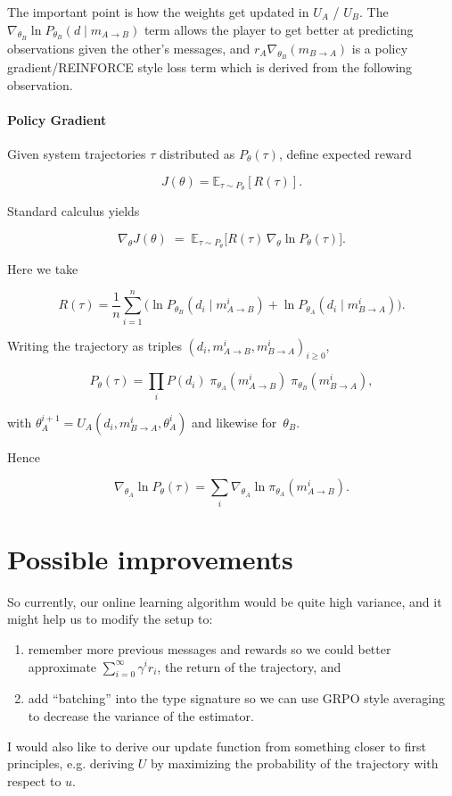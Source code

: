 \documentclass{article}
\begin{document}
The important point is how the weights get updated in $U_A$ / $U_B$.
The $\nabla_{\theta_B} \ln P_{\theta_B}(d \mid m_{A \rightarrow B})$ term allows the player to get better at predicting observations given the other's messages, and $r_A \nabla_{\theta_B} (m_{B \rightarrow A})$ is a policy gradient/REINFORCE style loss term which is derived from the following observation.

\paragraph{Policy Gradient}

Given system trajectories $\tau$ distributed as $P_\theta(\tau)$, define expected reward

$$
J(\theta)=\mathbb{E}_{\tau\sim P_\theta}[R(\tau)] .
$$

Standard calculus yields

$$
\nabla_\theta J(\theta)
\;=\;
\mathbb{E}_{\tau\sim P_\theta}\!\bigl[R(\tau)\,\nabla_\theta\ln P_\theta(\tau)\bigr].
$$

Here we take

$$
R(\tau)=\frac{1}{n}\sum_{i=1}^{n}\!
\bigl(
\ln P_{\theta_B}(d_i\mid m_{A\to B}^i)
+
\ln P_{\theta_A}(d_i\mid m_{B\to A}^i)
\bigr).
$$

Writing the trajectory as triples
$(d_i,m_{A\to B}^i,m_{B\to A}^i)_{i\ge 0}$,

$$
P_\theta(\tau)
=\prod_{i}
P(d_i)\;
\pi_{\theta_A}(m_{A\to B}^i)
\;
\pi_{\theta_B}(m_{B\to A}^i),
$$

with
$\theta_A^{i+1}=U_A(d_i,m_{B\to A}^i,\theta_A^i)$
and likewise for~$\theta_B$.

Hence

$$
\nabla_{\theta_A}\ln P_\theta(\tau)
=\sum_{i}\nabla_{\theta_A}\ln\pi_{\theta_A}(m_{A\to B}^i).
$$

\section{Possible improvements}\label{sec:improvements}

So currently, our online learning algorithm would be quite high variance, and it might help us to modify the setup to:
\begin{enumerate}
\item remember more previous messages and rewards so we could better approximate $\sum_{i=0}^{\infty} \gamma^i r_i$, the return of the trajectory, and 
\item add ``batching'' into the type signature so we can use GRPO style averaging to decrease the variance of the estimator.
\end{enumerate}

I would also like to derive our update function from something closer to first principles, e.g. deriving $U$ by maximizing the probability of the trajectory with respect to $u$.
\end{document}
